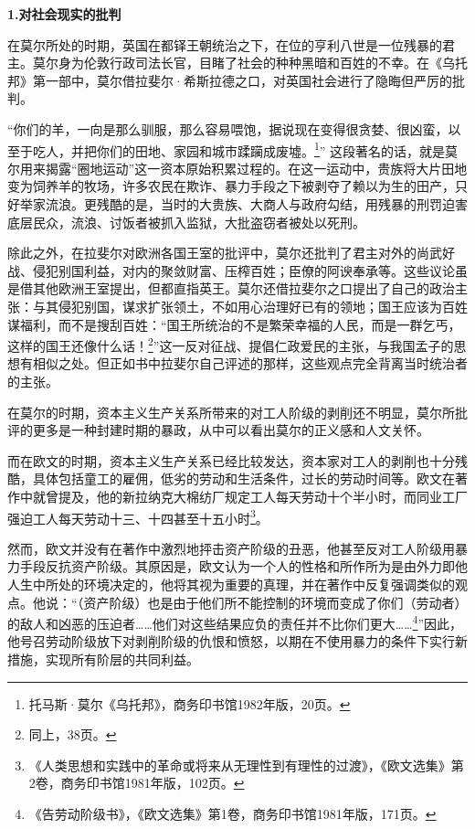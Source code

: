 \par \textbf {1.对社会现实的批判}
\par 在莫尔所处的时期，英国在都铎王朝统治之下，在位的亨利八世是一位残暴的君主。莫尔身为伦敦行政司法长官，目睹了社会的种种黑暗和百姓的不幸。在《乌托邦》第一部中，莫尔借拉斐尔·希斯拉德之口，对英国社会进行了隐晦但严厉的批判。
\par “你们的羊，一向是那么驯服，那么容易喂饱，据说现在变得很贪婪、很凶蛮，以至于吃人，并把你们的田地、家园和城市蹂躏成废墟。\footnote{托马斯·莫尔《乌托邦》，商务印书馆1982年版，20页。}” 这段著名的话，就是莫尔用来揭露“圈地运动”这一资本原始积累过程的。在这一运动中，贵族将大片田地变为饲养羊的牧场，许多农民在欺诈、暴力手段之下被剥夺了赖以为生的田产，只好举家流浪。更残酷的是，当时的大贵族、大商人与政府勾结，用残暴的刑罚迫害底层民众，流浪、讨饭者被抓入监狱，大批盗窃者被处以死刑。
\par 除此之外，在拉斐尔对欧洲各国王室的批评中，莫尔还批判了君主对外的尚武好战、侵犯别国利益，对内的聚敛财富、压榨百姓；臣僚的阿谀奉承等。这些议论虽是借其他欧洲王室提出，但都直指英王。莫尔还借拉斐尔之口提出了自己的政治主张：与其侵犯别国，谋求扩张领土，不如用心治理好已有的领地；国王应该为百姓谋福利，而不是搜刮百姓：“国王所统治的不是繁荣幸福的人民，而是一群乞丐，这样的国王还像什么话！\footnote{同上，38页。}”这一反对征战、提倡仁政爱民的主张，与我国孟子的思想有相似之处。但正如书中拉斐尔自己评述的那样，这些观点完全背离当时统治者的主张。
\par 在莫尔的时期，资本主义生产关系所带来的对工人阶级的剥削还不明显，莫尔所批评的更多是一种封建时期的暴政，从中可以看出莫尔的正义感和人文关怀。
\par 而在欧文的时期，资本主义生产关系已经比较发达，资本家对工人的剥削也十分残酷，具体包括童工的雇佣，低劣的劳动和生活条件，过长的劳动时间等。欧文在著作中就曾提及，他的新拉纳克大棉纺厂规定工人每天劳动十个半小时，而同业工厂强迫工人每天劳动十三、十四甚至十五小时\footnote{《人类思想和实践中的革命或将来从无理性到有理性的过渡》，《欧文选集》第2卷，商务印书馆1981年版，102页。}。
\par 然而，欧文并没有在著作中激烈地抨击资产阶级的丑恶，他甚至反对工人阶级用暴力手段反抗资产阶级。其原因是，欧文认为一个人的性格和所作所为是由外力即他人生中所处的环境决定的，他将其视为重要的真理，并在著作中反复强调类似的观点。他说：“（资产阶级）也是由于他们所不能控制的环境而变成了你们（劳动者）的敌人和凶恶的压迫者……他们对这些结果应负的责任并不比你们更大……\footnote{《告劳动阶级书》，《欧文选集》第1卷，商务印书馆1981年版，171页。}”因此，他号召劳动阶级放下对剥削阶级的仇恨和愤怒，以期在不使用暴力的条件下实行新措施，实现所有阶层的共同利益。
